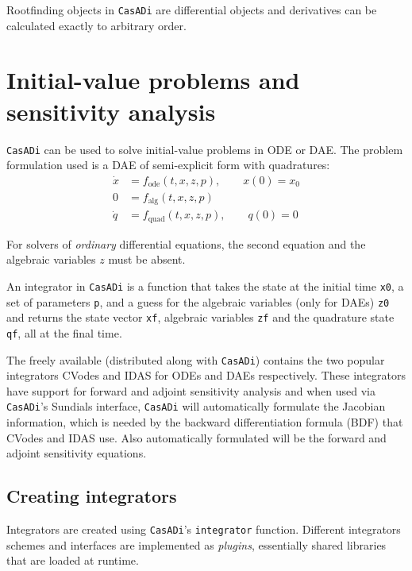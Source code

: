 \documentclass[a4paper,12pt]{book}
\newcommand{\CasADi}{\texttt{CasADi}\xspace}
\begin{document}
Rootfinding objects in \CasADi are differential objects and derivatives can be calculated exactly to arbitrary order.

\section{Initial-value problems and sensitivity analysis} \label{sec:integrator}
\CasADi can be used to solve initial-value problems in ODE or DAE. The problem formulation used
is a DAE of semi-explicit form with quadratures:
\begin{subequations}
\begin{align}
 \dot{x} &= f_{\text{ode}}(t,x,z,p), \qquad x(0) = x_0 \\
      0  &= f_{\text{alg}}(t,x,z,p) \\
 \dot{q} &= f_{\text{quad}}(t,x,z,p), \qquad q(0) = 0
\end{align}
\end{subequations}

For solvers of \emph{ordinary} differential equations, the second equation and the algebraic variables $z$ must be absent.

An integrator in \CasADi is a function that takes the state at the initial time \texttt{x0}, a set of parameters \texttt{p}, and a guess for the algebraic variables (only for DAEs) \texttt{z0} and returns the state vector \texttt{xf}, algebraic variables \texttt{zf} and the quadrature state \texttt{qf}, all at the final time.

The freely available  (distributed along with \CasADi) contains the two popular integrators CVodes and IDAS for ODEs and DAEs respectively. These integrators have support for forward and adjoint sensitivity analysis and when used via \CasADi's Sundials interface, \CasADi will automatically formulate the Jacobian information, which is needed by the backward differentiation formula (BDF) that CVodes and IDAS use. Also automatically formulated will be the forward and adjoint sensitivity equations.

\subsection{Creating integrators}
Integrators are created using \CasADi's \texttt{integrator} function. Different integrators schemes and interfaces are implemented as \emph{plugins}, essentially shared libraries that are loaded at runtime.
\end{document}

